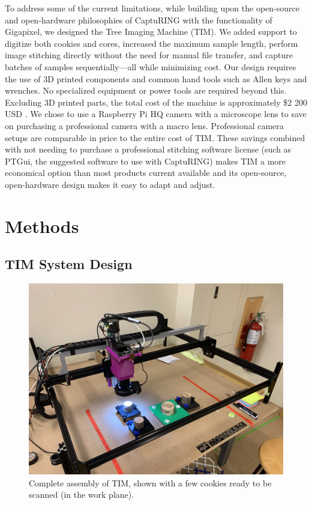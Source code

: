 \documentclass[a4paper,12pt]{article}
\begin{document}
To address some of the current limitations, while building upon the open-source and open-hardware philosophies of CaptuRING with the functionality of Gigapixel, we designed the Tree Imaging Machine (TIM).
We added support to digitize both cookies and cores, increased the maximum sample length, perform image stitching directly without the need for manual file transfer, and capture batches of samples sequentially---all while minimizing cost.
Our design requires the use of 3D printed components and common hand tools such as Allen keys and wrenches. No specialized equipment or power tools are required beyond this. %
Excluding 3D printed parts, the total cost of the machine is approximately \$2 200 USD \citep[compared to the \$70 000 USD of the Gigapixel,][]{griffin_gigapixel_2021}.
We chose to use a Raspberry Pi HQ camera with a microscope lens to save on purchasing a professional camera with a macro lens. Professional camera setups are comparable in price to the entire cost of TIM.
These savings combined with not needing to purchase a professional stitching software license (such as PTGui, the suggested software to use with CaptuRING) makes TIM a more economical option than most products current available and its open-source, open-hardware design makes it easy to adapt and adjust. %

\section{Methods}

\subsection{TIM System Design} %

\begin{figure}
  \centering
  \includegraphics[height=0.5\linewidth]{../content/tina.jpg}
  \caption{Complete assembly of TIM, shown with a few cookies ready to be scanned (in the work plane).}
  \label{fig:tim_assembled}
\end{figure}
\end{document}
